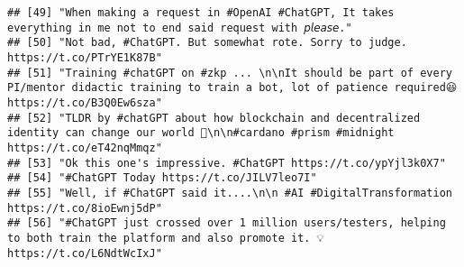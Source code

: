 \documentclass[
]{article}
\begin{document}
\begin{verbatim}
## [49] "When making a request in #OpenAI #ChatGPT, It takes everything in me not to end said request with 𝘱𝘭𝘦𝘢𝘴𝘦."                                                                                                                                                                                                                            
## [50] "Not bad, #ChatGPT. But somewhat rote. Sorry to judge. https://t.co/PTrYE1K87B"                                                                                                                                                                                                                                                        
## [51] "Training #chatGPT on #zkp ... \n\nIt should be part of every PI/mentor didactic training to train a bot, lot of patience required😆 https://t.co/B3Q0Ew6sza"                                                                                                                                                                          
## [52] "TLDR by #chatGPT about how blockchain and decentralized identity can change our world 🖖\n\n#cardano #prism #midnight https://t.co/eT42nqMmqz"                                                                                                                                                                                        
## [53] "Ok this one's impressive. #ChatGPT https://t.co/ypYjl3k0X7"                                                                                                                                                                                                                                                                           
## [54] "#ChatGPT Today https://t.co/JILV7leo7I"                                                                                                                                                                                                                                                                                               
## [55] "Well, if #ChatGPT said it....\n\n #AI #DigitalTransformation https://t.co/8ioEwnj5dP"                                                                                                                                                                                                                                                 
## [56] "#ChatGPT just crossed over 1 million users/testers, helping to both train the platform and also promote it. 💡 https://t.co/L6NdtWcIxJ"                                                                                                                                                                                               

\end{verbatim}
\end{document}
